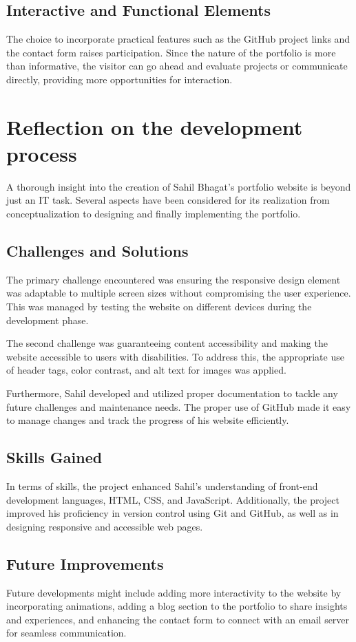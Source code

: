 \documentclass{article}
\begin{document}
\subsection{Interactive and Functional Elements}
The choice to incorporate practical features such as the GitHub project links and the contact form raises participation. Since the nature of the portfolio is more than informative, the visitor can go ahead and evaluate projects or communicate directly, providing more opportunities for interaction. 

\section{Reflection on the development process}
A thorough insight into the creation of Sahil Bhagat’s portfolio website is beyond just an IT task. Several aspects have been considered for its realization from conceptualization to designing and finally implementing the portfolio. 

\subsection{Challenges and Solutions}
The primary challenge encountered was ensuring the responsive design element was adaptable to multiple screen sizes without compromising the user experience. This was managed by testing the website on different devices during the development phase. 

The second challenge was guaranteeing content accessibility and making the website accessible to users with disabilities. To address this, the appropriate use of header tags, color contrast, and alt text for images was applied. 

Furthermore, Sahil developed and utilized proper documentation to tackle any future challenges and maintenance needs. The proper use of GitHub made it easy to manage changes and track the progress of his website efficiently. 

\subsection{Skills Gained}
In terms of skills, the project enhanced Sahil’s understanding of front-end development languages, HTML, CSS, and JavaScript. Additionally, the project improved his proficiency in version control using Git and GitHub, as well as in designing responsive and accessible web pages.

\subsection{Future Improvements}
Future developments might include adding more interactivity to the website by incorporating animations, adding a blog section to the portfolio to share insights and experiences, and enhancing the contact form to connect with an email server for seamless communication. 
\end{document}
